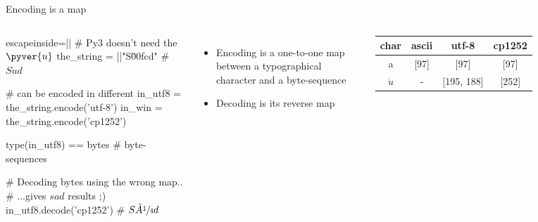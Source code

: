 \begin{pyframe}{Encoding is a map}
\begin{columns}


\begin{pycode*}{escapeinside=||}
# Py3 doesn't need the $\pyver{u}$
the_string = ||"S\u00fcd" # $S\ddot{u}d$

# can be encoded in different
in_utf8 =  the_string.encode('utf-8')
in_win = the_string.encode('cp1252')

type(in_utf8) == bytes # byte-sequences

# Decoding bytes using the wrong map..
# ...gives $sad$ results ;)
in_utf8.decode('cp1252') # $S\tilde{A}\sfrac{1}{4}d$





\end{pycode*}

\begin{itemize}
\item Encoding is a one-to-one map between a typographical character and a byte-sequence
\item Decoding is its reverse map
\end{itemize}

\small
\begin{tabular}{|c||c|c|c|}\hline
char        & ascii     & utf-8         & cp1252     \\ \hline
a           & [97]      & [97]          & [97]      \\ \hline
$\ddot{u}$  & -         & [195, 188]    & [252]              \\ \hline
\end{tabular}
\end{columns}

\end{pyframe}




